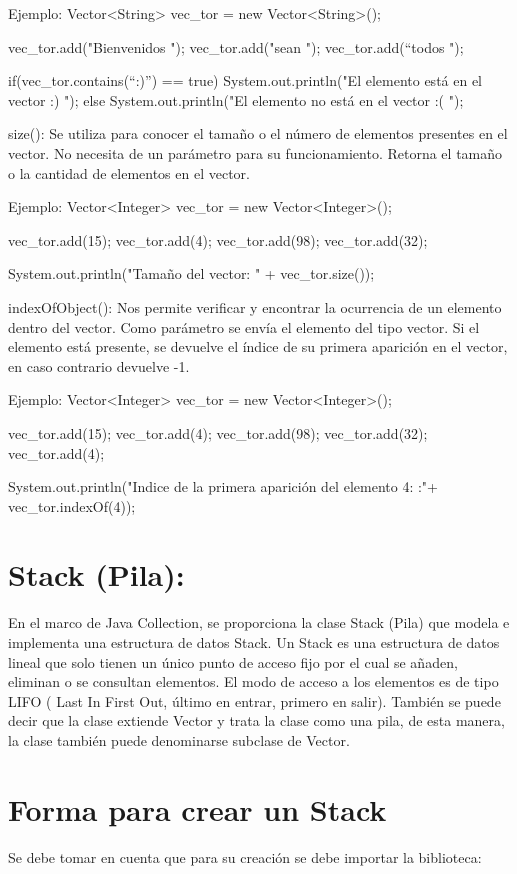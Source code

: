 \documentclass[12pt, letterpaper]{article} %
\begin{document}
Ejemplo:
Vector<String> vec_tor = new Vector<String>();

vec_tor.add("Bienvenidos ");
vec_tor.add("sean ");
vec_tor.add(“todos ");

if(vec_tor.contains(“:)”) == true){
System.out.println("El elemento está en el vector :) ");
}
else{
	System.out.println("El elemento no está en el vector :( ");
}


size():
Se utiliza para conocer el tamaño o el número de elementos presentes en el vector. No necesita de un parámetro para su funcionamiento. Retorna el tamaño o la cantidad de elementos en el vector.

Ejemplo:
Vector<Integer> vec_tor = new Vector<Integer>();

vec_tor.add(15);
vec_tor.add(4);
vec_tor.add(98);
vec_tor.add(32);

System.out.println("Tamaño del vector:  " + vec_tor.size());


indexOfObject():
Nos permite verificar y encontrar la ocurrencia de un elemento dentro del vector. Como parámetro se envía el elemento del tipo vector. Si el elemento está presente, se devuelve el índice de su primera aparición en el vector, en caso contrario devuelve -1.

Ejemplo:
Vector<Integer> vec_tor = new Vector<Integer>();

vec_tor.add(15);
vec_tor.add(4);
vec_tor.add(98);
vec_tor.add(32);
vec_tor.add(4);

System.out.println("Indice de la primera aparición del elemento 4: :"+ vec_tor.indexOf(4));

\section*{Stack (Pila):}
En el marco de Java Collection, se proporciona la clase Stack (Pila) que modela e implementa una estructura de datos Stack. Un Stack es una estructura de datos lineal que solo tienen un único punto de acceso fijo por el cual se añaden, eliminan o se consultan elementos. El modo de acceso a los elementos es de tipo LIFO ( Last In First Out, último en entrar, primero en salir).
También se puede decir que la clase extiende Vector y trata la clase como una pila, de esta manera, la clase también puede denominarse subclase de Vector.

\section*{Forma para crear un Stack}
Se debe tomar en cuenta que para su creación se debe importar la biblioteca:
\end{document}

